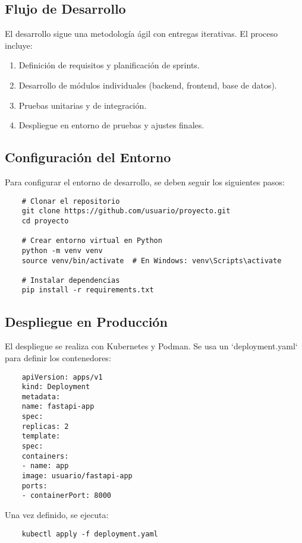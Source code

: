 \subsection{Flujo de Desarrollo}
El desarrollo sigue una metodología ágil con entregas iterativas. El proceso incluye:

\begin{enumerate}
	\item Definición de requisitos y planificación de sprints.
	\item Desarrollo de módulos individuales (backend, frontend, base de datos).
	\item Pruebas unitarias y de integración.
	\item Despliegue en entorno de pruebas y ajustes finales.
\end{enumerate}

\subsection{Configuración del Entorno}
Para configurar el entorno de desarrollo, se deben seguir los siguientes pasos:

\begin{verbatim}
	# Clonar el repositorio
	git clone https://github.com/usuario/proyecto.git
	cd proyecto
	
	# Crear entorno virtual en Python
	python -m venv venv
	source venv/bin/activate  # En Windows: venv\Scripts\activate
	
	# Instalar dependencias
	pip install -r requirements.txt
\end{verbatim}

\subsection{Despliegue en Producción}
El despliegue se realiza con Kubernetes y Podman. Se usa un `deployment.yaml` para definir los contenedores:

\begin{verbatim}
	apiVersion: apps/v1
	kind: Deployment
	metadata:
	name: fastapi-app
	spec:
	replicas: 2
	template:
	spec:
	containers:
	- name: app
	image: usuario/fastapi-app
	ports:
	- containerPort: 8000
\end{verbatim}

Una vez definido, se ejecuta:

\begin{verbatim}
	kubectl apply -f deployment.yaml
\end{verbatim}

